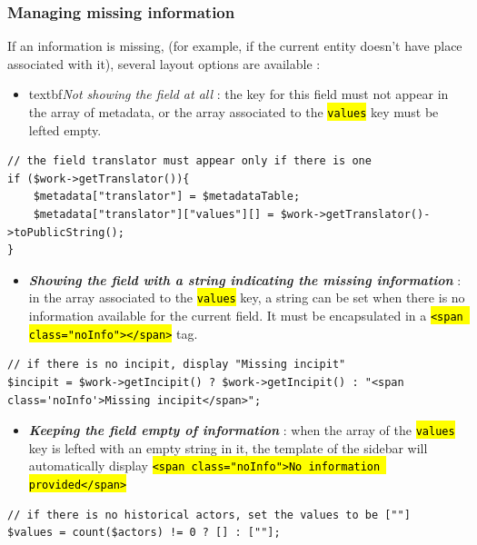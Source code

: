 \documentclass[a4paper,12pt,twoside]{book}
\let\OldTexttt\texttt
\renewcommand{\texttt}[1]{\OldTexttt{\hl{#1}}}
\begin{document}
				\subsubsection{Managing missing information}\label{managing-missing-information}

If an information is missing, (for example, if the current entity doesn't have place associated with it), several layout options are available :
\begin{itemize}
	\item textbf{\emph{Not showing the field at all}} : the key for this field must not appear in the array of metadata, or the array associated to the \texttt{values} key must be lefted empty.
\end{itemize}

\begin{lstlisting}
// the field translator must appear only if there is one
if ($work->getTranslator()){
    $metadata["translator"] = $metadataTable;
    $metadata["translator"]["values"][] = $work->getTranslator()->toPublicString();
}
\end{lstlisting}

\begin{itemize}
	\item \textbf{\emph{Showing the field with a string indicating the missing information}} : in the array associated to the \texttt{values} key, a string can be set when there is no information available for the current field. It must be encapsulated in a \texttt{\textless{}span class="noInfo"\textgreater{}\textless{}/span\textgreater{}} tag.
\end{itemize}

\begin{lstlisting}
// if there is no incipit, display "Missing incipit"
$incipit = $work->getIncipit() ? $work->getIncipit() : "<span class='noInfo'>Missing incipit</span>";
\end{lstlisting}

\begin{itemize}
	\item \textbf{\emph{Keeping the field empty of information}} : when the array of the \texttt{values} key is lefted with an empty string in it, the template of the sidebar will automatically display \texttt{\textless{}span class="noInfo"\textgreater{}No information provided\textless{}/span\textgreater{}}
\end{itemize}

\begin{lstlisting}
// if there is no historical actors, set the values to be [""]
$values = count($actors) != 0 ? [] : [""];
\end{lstlisting}
\end{document}
